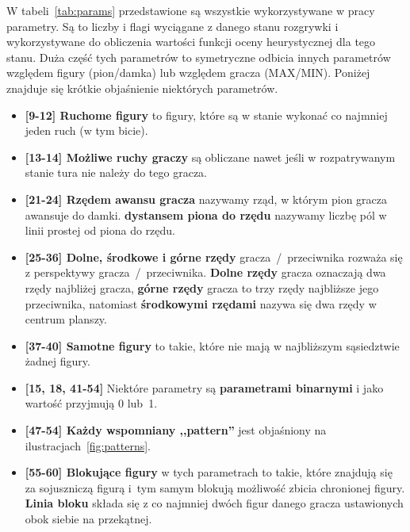 \FloatBarrier

% 


W tabeli~\ref{tab:params} przedstawione są wszystkie wykorzystywane w pracy parametry. Są to liczby i flagi wyciągane z danego stanu rozgrywki i wykorzystywane do obliczenia wartości funkcji oceny heurystycznej dla tego stanu. Duża część tych parametrów to symetryczne odbicia innych parametrów względem figury (pion/damka) lub względem gracza (MAX/MIN). Poniżej znajduje się krótkie objaśnienie niektórych parametrów.

\begin{itemize}
    \item \textbf{[9-12] Ruchome figury} to figury, które są w stanie wykonać co najmniej jeden ruch (w tym bicie).
    \item \textbf{[13-14] Możliwe ruchy graczy} są obliczane nawet jeśli w rozpatrywanym stanie tura nie należy do tego gracza.
    \item \textbf{[21-24] Rzędem awansu gracza} nazywamy rząd, w którym pion gracza awansuje do damki. \textbf{dystansem piona do rzędu} nazywamy liczbę pól w linii prostej od piona do rzędu.
    \item \textbf{[25-36] Dolne, środkowe i górne rzędy} gracza~/~przeciwnika rozważa się z perspektywy gracza~/~przeciwnika. \textbf{Dolne rzędy} gracza oznaczają dwa rzędy najbliżej gracza, \textbf{górne rzędy} gracza to trzy rzędy najbliższe jego przeciwnika, natomiast \textbf{środkowymi rzędami} nazywa się dwa rzędy w centrum planszy.
    \item \textbf{[37-40] Samotne figury} to takie, które nie mają w najbliższym sąsiedztwie żadnej figury.
    \item \textbf{[15, 18, 41-54]} Niektóre parametry są \textbf{parametrami binarnymi} i jako wartość przyjmują 0 lub~1.
    \item \textbf{[47-54] Każdy wspomniany ,,pattern''} jest objaśniony na ilustracjach~\ref{fig:patterns}.
    \item \textbf{[55-60] Blokujące figury} w tych parametrach to takie, które znajdują się za sojuszniczą figurą i~tym samym blokują możliwość zbicia chronionej figury. \textbf{Linia bloku} składa się z co najmniej dwóch figur danego gracza ustawionych obok siebie na przekątnej.
\end{itemize}

